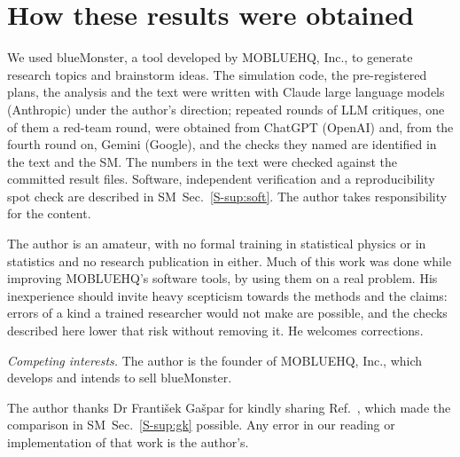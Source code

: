\documentclass[aps,pre,twocolumn,superscriptaddress,nofootinbib,10pt]{revtex4-2}
\newcommand{\SM}{SM}
\begin{document}
\section*{How these results were obtained}
We used blueMonster, a tool developed by MOBLUEHQ, Inc., to generate research topics and brainstorm ideas. The simulation code, the pre-registered plans, the analysis and the text were written with Claude large language models (Anthropic) under the author's direction; repeated rounds of LLM critiques, one of them a red-team round, were obtained from ChatGPT (OpenAI) and, from the fourth round on, Gemini (Google), and the checks they named are identified in the text and the \SM. The numbers in the text were checked against the committed result files. Software, independent verification and a reproducibility spot check are described in \SM\ Sec.~\ref{S-sup:soft}. The author takes responsibility for the content.

The author is an amateur, with no formal training in statistical physics or in statistics and no research publication in either. Much of this work was done while improving MOBLUEHQ's software tools, by using them on a real problem. His inexperience should invite heavy scepticism towards the methods and the claims: errors of a kind a trained researcher would not make are possible, and the checks described here lower that risk without removing it. He welcomes corrections.

\emph{Competing interests.} The author is the founder of MOBLUEHQ, Inc., which develops and intends to sell blueMonster.

\begin{acknowledgments}
The author thanks Dr Franti\v{s}ek Ga\v{s}par for kindly sharing Ref.~\cite{gk2022}, which made the comparison in \SM\ Sec.~\ref{S-sup:gk} possible. Any error in our reading or implementation of that work is the author's.
\end{acknowledgments}



\end{document}
